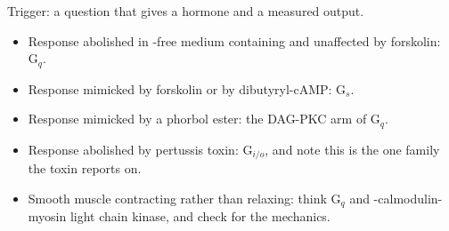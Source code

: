 \begin{tipbox}[title={TECHNIQUE: tell a $\mathrm{G}_q$ response from a $\mathrm{G}_s$ response}]
Trigger: a question that gives a hormone and a measured output.
\begin{itemize}
\item Response abolished in -free medium containing  and
unaffected by forskolin: $\mathrm{G}_q$.
\item Response mimicked by forskolin or by dibutyryl-cAMP: $\mathrm{G}_s$.
\item Response mimicked by a phorbol ester: the DAG-PKC arm of $\mathrm{G}_q$.
\item Response abolished by pertussis toxin: $\mathrm{G}_{i/o}$, and note this is the
one family the toxin reports on.
\item Smooth muscle contracting rather than relaxing: think $\mathrm{G}_q$ and
-calmodulin-myosin light chain kinase, and check
 for the mechanics.
\end{itemize}
\end{tipbox}
